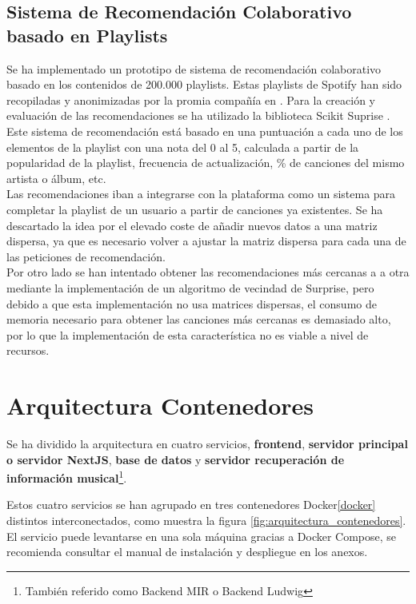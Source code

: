 \subsection{Sistema de Recomendación Colaborativo basado en Playlists} \label{recomend_colab}
Se ha implementado un prototipo de sistema de recomendación colaborativo basado en los contenidos de 200.000 playlists. Estas playlists de Spotify han sido recopiladas y anonimizadas por la promia compañía en \cite{million_playlist_dataset}. Para la creación y evaluación de las recomendaciones se ha utilizado la biblioteca Scikit Suprise \cite{supriselib}.\\
Este sistema de recomendación está basado en una puntuación a cada uno de los elementos de la playlist con una nota del 0 al 5, calculada a partir de la popularidad de la playlist, frecuencia de actualización, \% de canciones del mismo artista o álbum, etc.\\
Las recomendaciones iban a integrarse con la plataforma como un sistema para completar la playlist de un usuario a partir de canciones ya existentes. Se ha descartado la idea por el elevado coste de añadir nuevos datos a una matriz dispersa, ya que es necesario volver a ajustar la matriz dispersa para cada una de las peticiones de recomendación.\\
Por otro lado se han intentado obtener las recomendaciones más cercanas a a otra mediante la implementación de un algoritmo de vecindad de Surprise, pero debido a que esta implementación no usa matrices dispersas, el consumo de memoria necesario para obtener las canciones más cercanas es demasiado alto, por lo que la implementación de esta característica no es viable a nivel de recursos.


\section{Arquitectura Contenedores}

Se ha dividido la arquitectura en cuatro servicios, \textbf{frontend}, \textbf{servidor principal o servidor NextJS}, \textbf{base de datos} y \textbf{servidor recuperación de información musical}\footnote{También referido como Backend MIR o Backend Ludwig}. 

Estos cuatro servicios se han agrupado en tres contenedores Docker\ref{docker} distintos interconectados, como muestra la figura \ref{fig:arquitectura_contenedores}.\\
El servicio puede levantarse en una sola máquina gracias a Docker Compose, se recomienda consultar el manual de instalación y despliegue en los anexos. 

